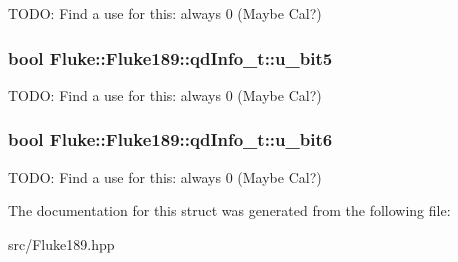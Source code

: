 \label{structFluke_1_1Fluke189_1_1qdInfo__t_a012174b29b7e6686a724204f63a09c91}
TODO: Find a use for this: always 0 (Maybe Cal?) \hypertarget{structFluke_1_1Fluke189_1_1qdInfo__t_ad123acd44f39185d0903250085834b72}{
\subsubsection[{u\_\-bit5}]{\setlength{\rightskip}{0pt plus 5cm}bool {\bf Fluke::Fluke189::qdInfo\_\-t::u\_\-bit5}}}
\label{structFluke_1_1Fluke189_1_1qdInfo__t_ad123acd44f39185d0903250085834b72}
TODO: Find a use for this: always 0 (Maybe Cal?) \hypertarget{structFluke_1_1Fluke189_1_1qdInfo__t_a3a48f6b82d6abd8613a7f7f091c7ad16}{
\subsubsection[{u\_\-bit6}]{\setlength{\rightskip}{0pt plus 5cm}bool {\bf Fluke::Fluke189::qdInfo\_\-t::u\_\-bit6}}}
\label{structFluke_1_1Fluke189_1_1qdInfo__t_a3a48f6b82d6abd8613a7f7f091c7ad16}
TODO: Find a use for this: always 0 (Maybe Cal?) 

The documentation for this struct was generated from the following file:\begin{DoxyCompactItemize}
\item 
src/Fluke189.hpp\end{DoxyCompactItemize}
